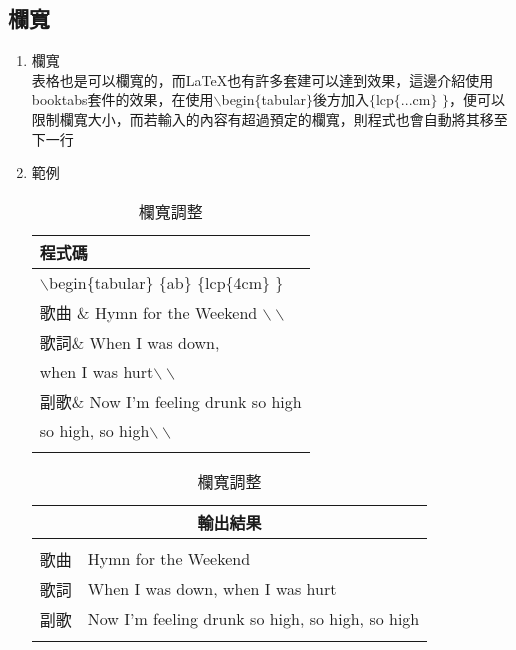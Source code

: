 \subsection{欄寬}
\begin{enumerate}
\item 欄寬\\
表格也是可以欄寬的，而\LaTeX 也有許多套建可以達到效果，這邊介紹使用{\A booktabs}套件的效果，在使用$\backslash$begin$\{$tabular$\}$後方加入$\{$lcp$\{$...cm$\}$ $\}$，便可以限制欄寬大小，而若輸入的內容有超過預定的欄寬，則程式也會自動將其移至下一行
\item 範例\\
\begin{table}[H]\caption{欄寬調整}\label{wide}
    \centering
    \extrarowheight=2pt
    \begin{tabular}{l}
    程式碼\\
    \hline
    $\backslash$begin$\{$tabular$\}$ $\{$ab$\}$ $\{$lcp$\{$4cm$\}$ $\}$\\
    歌曲 \& Hymn for the Weekend $\backslash\backslash$\\
    歌詞\& When I was down,\\
    when I was hurt$\backslash\backslash$\\
    副歌\& Now I'm feeling drunk so high\\
    so high, so high$\backslash\backslash$\\\\  
    \end{tabular}\hspace{10pt}
   \begin{tabular}{cp{4cm}}
    \multicolumn{2}{c}{輸出結果}\\
	\hline\\
	歌曲     & Hymn for the Weekend\\
	歌詞     &  When I was down, when I was hurt\\
	副歌     &  Now I'm feeling drunk so high, so high, so high\\ \\   
   
   \end{tabular} 
\end{table}
\end{enumerate}
